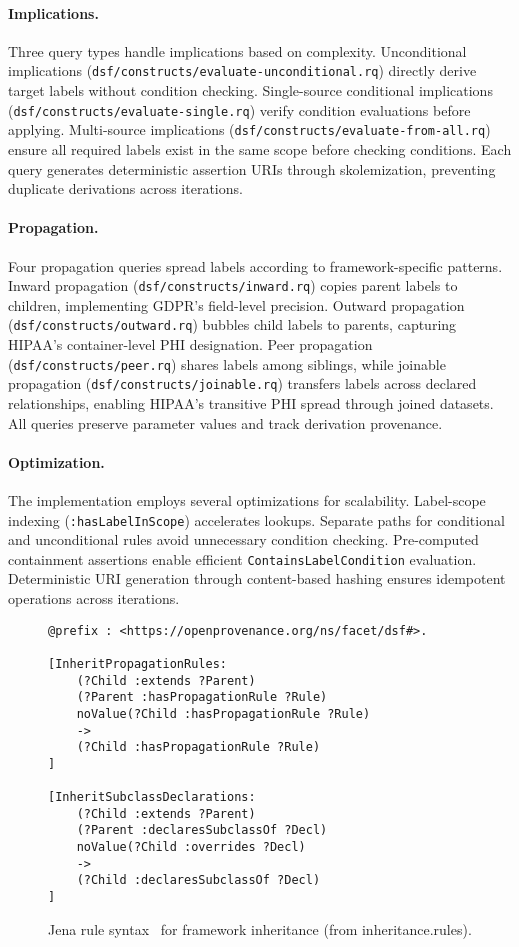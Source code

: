 \documentclass{IOS-Book-Article}
\begin{document}
\paragraph{Implications.}
Three query types handle implications based on complexity. Unconditional implications (\texttt{dsf/constructs/evaluate-unconditional.rq}) directly derive target labels without condition checking. Single-source conditional implications (\texttt{dsf/constructs/evaluate-single.rq}) verify condition evaluations before applying. Multi-source implications (\texttt{dsf/constructs/evaluate-from-all.rq}) ensure all required labels exist in the same scope before checking conditions. Each query generates deterministic assertion URIs through skolemization, preventing duplicate derivations across iterations.

\paragraph{Propagation.}
Four propagation queries spread labels according to framework-specific patterns. Inward propagation (\texttt{dsf/constructs/inward.rq}) copies parent labels to children, implementing GDPR's field-level precision. Outward propagation (\texttt{dsf/constructs/outward.rq}) bubbles child labels to parents, capturing HIPAA's container-level PHI designation. Peer propagation (\texttt{dsf/constructs/peer.rq}) shares labels among siblings, while joinable propagation (\texttt{dsf/constructs/joinable.rq}) transfers labels across declared relationships, enabling HIPAA's transitive PHI spread through joined datasets. All queries preserve parameter values and track derivation provenance.

\paragraph{Optimization.}
The implementation employs several optimizations for scalability. Label-scope indexing ({\footnotesize\texttt{:hasLabelInScope}}) accelerates lookups. Separate paths for conditional and unconditional rules avoid unnecessary condition checking. Pre-computed containment assertions enable efficient {\footnotesize\texttt{ContainsLabelCondition}} evaluation. Deterministic URI generation through content-based hashing ensures idempotent operations across iterations.

\begin{figure}[ht]
\begin{lstlisting}[basicstyle=\ttfamily, frame=none]
@prefix : <https://openprovenance.org/ns/facet/dsf#>.

[InheritPropagationRules:
    (?Child :extends ?Parent)
    (?Parent :hasPropagationRule ?Rule)
    noValue(?Child :hasPropagationRule ?Rule)
    ->
    (?Child :hasPropagationRule ?Rule)
]

[InheritSubclassDeclarations:
    (?Child :extends ?Parent)
    (?Parent :declaresSubclassOf ?Decl)
    noValue(?Child :overrides ?Decl)
    ->
    (?Child :declaresSubclassOf ?Decl)
]
\end{lstlisting}
\caption{Jena rule syntax~\cite{jena} for framework inheritance (from inheritance.rules).}
\label{fig:appendix-jena-rule}
\end{figure}
\end{document}
